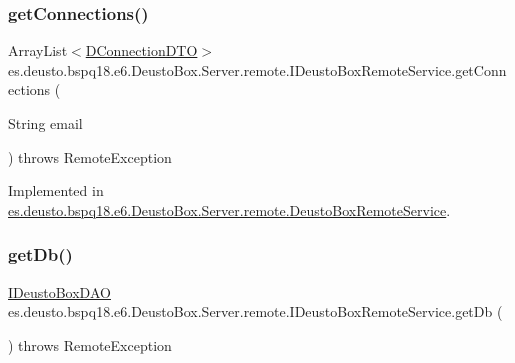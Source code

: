 \subsubsection{\texorpdfstring{get\+Connections()}{getConnections()}}
{\footnotesize\ttfamily Array\+List$<$\mbox{\hyperlink{classes_1_1deusto_1_1bspq18_1_1e6_1_1_deusto_box_1_1_server_1_1dto_1_1_d_connection_d_t_o}{D\+Connection\+D\+TO}}$>$ es.\+deusto.\+bspq18.\+e6.\+Deusto\+Box.\+Server.\+remote.\+I\+Deusto\+Box\+Remote\+Service.\+get\+Connections (\begin{DoxyParamCaption}\item[{String}]{email }\end{DoxyParamCaption}) throws Remote\+Exception}



Implemented in \mbox{\hyperlink{classes_1_1deusto_1_1bspq18_1_1e6_1_1_deusto_box_1_1_server_1_1remote_1_1_deusto_box_remote_service_adae22cc31bb23023630a6d333318363c}{es.\+deusto.\+bspq18.\+e6.\+Deusto\+Box.\+Server.\+remote.\+Deusto\+Box\+Remote\+Service}}.

\mbox{\label{interfacees_1_1deusto_1_1bspq18_1_1e6_1_1_deusto_box_1_1_server_1_1remote_1_1_i_deusto_box_remote_service_ac9d6749c6cebd4a9362975e1e3def1d8}} 
\subsubsection{\texorpdfstring{get\+Db()}{getDb()}}
{\footnotesize\ttfamily \mbox{\hyperlink{interfacees_1_1deusto_1_1bspq18_1_1e6_1_1_deusto_box_1_1_server_1_1jdo_1_1dao_1_1_i_deusto_box_d_a_o}{I\+Deusto\+Box\+D\+AO}} es.\+deusto.\+bspq18.\+e6.\+Deusto\+Box.\+Server.\+remote.\+I\+Deusto\+Box\+Remote\+Service.\+get\+Db (\begin{DoxyParamCaption}{ }\end{DoxyParamCaption}) throws Remote\+Exception}



